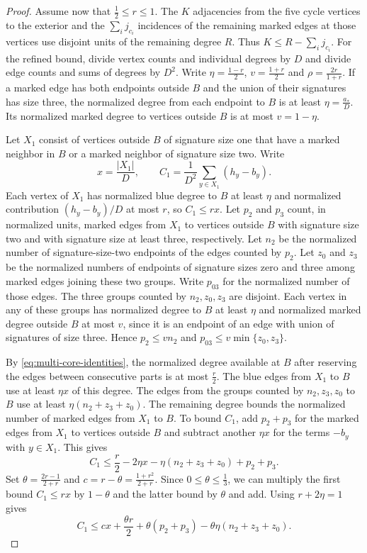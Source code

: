 \documentclass[preprint,11pt,numbers]{elsarticle-arxiv}
\numberwithin{equation}{section}
\theoremstyle{definition}
\begin{document}
\begin{proof}
Assume now that $\frac{1}{2}\le r\le1$. The $K$ adjacencies from the
five cycle vertices to the exterior and the $\sum_i j_{c_i}$ incidences
of the remaining marked edges at those vertices use disjoint units of the remaining
degree $R$. Thus $K\le R-\sum_i j_{c_i}$.
For the refined bound, divide vertex counts and individual degrees
by $D$ and divide edge counts and sums of degrees by $D^2$.
Write $\eta=\frac{1-r}{2}$, $v=\frac{1+r}{2}$ and
$\rho=\frac{2r}{1+r}$. If a marked edge has both endpoints
outside $B$ and the union of their signatures has size three,
the normalized degree from each endpoint to $B$ is at least
$\eta=\frac{a_*}{D}$. Its normalized marked degree to vertices
outside $B$ is at most $v=1-\eta$.

Let $X_1$ consist of vertices outside $B$ of signature size one
that have a marked neighbor in $B$ or a marked neighbor of
signature size two. Write
\[
 x=\frac{|X_1|}{D},\qquad
 C_1=\frac{1}{D^2}\sum_{y\in X_1}(h_y-b_y).
\]
Each vertex of $X_1$ has normalized blue degree to $B$ at least
$\eta$ and normalized contribution $(h_y-b_y)/D$ at most $r$,
so $C_1\leq rx$. Let $p_2$ and $p_3$ count, in normalized units,
marked edges from $X_1$ to vertices outside $B$ with signature size
two and with signature size at least three, respectively. Let $n_2$
be the normalized number of signature-size-two endpoints of the
edges counted by $p_2$. Let $z_0$ and $z_3$ be the normalized
numbers of endpoints of signature sizes zero and three among
marked edges joining these two groups. Write $p_{03}$ for the
normalized number of those edges. The three groups counted by
$n_2,z_0,z_3$ are disjoint. Each vertex in any of these groups
has normalized degree to $B$ at least $\eta$ and normalized
marked degree outside $B$ at most $v$, since it is an endpoint
of an edge with union of signatures of size three. Hence
$p_2\leq v n_2$ and $p_{03}\leq v\min\{z_0,z_3\}$.

By \eqref{eq:multi-core-identities}, the normalized degree
available at $B$ after reserving the edges between consecutive
parts is at most $\frac{r}{2}$. The blue edges from $X_1$ to $B$
use at least $\eta x$ of this degree. The edges from the groups
counted by $n_2,z_3,z_0$ to $B$ use at least
$\eta(n_2+z_3+z_0)$. The remaining degree bounds the normalized
number of marked edges from $X_1$ to $B$. To bound $C_1$, add
$p_2+p_3$ for the marked edges from $X_1$ to vertices outside
$B$ and subtract another $\eta x$ for the terms $-b_y$ with
$y\in X_1$. This gives
\[
 C_1\leq\frac{r}{2}-2\eta x-\eta(n_2+z_3+z_0)+p_2+p_3.
\]
Set $\theta=\frac{2r-1}{2+r}$ and
$c=r-\theta=\frac{1+r^2}{2+r}$. Since $0\leq\theta\leq\frac13$,
we can multiply the first bound $C_1\leq rx$ by $1-\theta$ and
the latter bound by $\theta$ and add. Using $r+2\eta=1$ gives
\begin{equation}\label{eq:multi-joint-first}
 C_1\le cx+\frac{\theta r}{2}
     +\theta(p_2+p_3)-\theta\eta(n_2+z_3+z_0).
\end{equation}


\end{proof}
\end{document}

